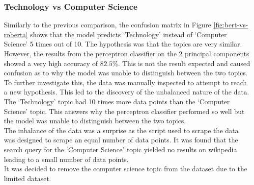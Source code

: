 \subsubsection{Technology vs Computer Science}
Similarly to the previous comparison, the confusion matrix in Figure \ref{fig:bert-vs-roberta} shows that the model predicts `Technology'
instead of `Computer Science' 5 times out of 10. The hypothesis was that the topics are very similar. However, the results from the 
perceptron classifier on the 2 principal components showed a very high accuracy of $82.5\%$. This is not the result expected and caused
confusion as to why the model was unable to distinguish between the two topics.\\
To further investigate this, the data was manually inspected to attempt to reach a new hypothesis. This led to the discovery of the 
unbalanced nature of the data. The `Technology' topic had 10 times more data points than the `Computer Science' topic. This answers why
the perceptron classifier performed so well but the model was unable to distinguish between the two topics.\\
The inbalance of the data was a surprise as the script used to scrape the data was designed to scrape an equal number of data points.
It was found that the search query for the `Computer Science' topic yielded no results on wikipedia leading to a small number of data
points.\\
It was decided to remove the computer science topic from the dataset due to the limited dataset.
